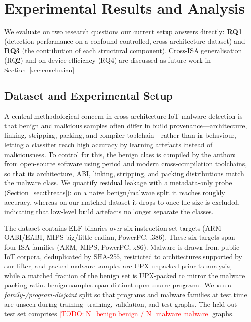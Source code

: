 \documentclass{llncs}
\begin{document}
\section{Experimental Results and Analysis}
\label{sec:experiments}

We evaluate  on two research questions our current setup
answers directly: \textbf{RQ1} (detection performance on a
confound-controlled, cross-architecture dataset) and \textbf{RQ3} (the
contribution of each structural component). Cross-ISA generalisation
(RQ2) and on-device efficiency (RQ4) are discussed as future work in
Section~\ref{sec:conclusion}.

\subsection{Dataset and Experimental Setup}
\label{sec:setup}

A central methodological concern in cross-architecture IoT malware
detection is that benign and malicious samples often differ in build
provenance---architecture, linking, stripping, packing, and compiler
toolchain---rather than in behaviour, letting a classifier reach high
accuracy by learning artefacts instead of maliciousness. To control for
this, the benign class is compiled by the authors from open-source
software using period and modern cross-compilation toolchains, so that its
architecture, ABI, linking, stripping, and packing distributions match
the malware class. We quantify residual leakage with a metadata-only
probe (Section~\ref{sec:threats}): on a naive benign/malware split it
reaches roughly \probeOld{} accuracy, whereas on our matched dataset it
drops to \probeNew{} once file size is excluded, indicating that low-level
build artefacts no longer separate the classes.

The dataset contains \dsTotal{} ELF binaries over six instruction-set
targets (ARM OABI/EABI, MIPS big/little endian, PowerPC, i386). These six targets span four ISA families (ARM, MIPS, PowerPC, x86). Malware is
drawn from public IoT corpora, deduplicated by SHA-256, restricted to
architectures supported by our lifter, and packed malware samples are
UPX-unpacked prior to analysis, while a matched fraction of the benign set
is UPX-packed to mirror the malware packing ratio.
benign samples span \dsBenignProg{} distinct open-source programs. We use a
\emph{family-/program-disjoint} split so that programs and malware
families at test time are unseen during training: \dsTrain{} training,
\dsVal{} validation, and \dsTest{} test graphs. The held-out test set comprises
\textcolor{red}{[TODO: N\_benign benign / N\_malware malware]} graphs.
\end{document}
